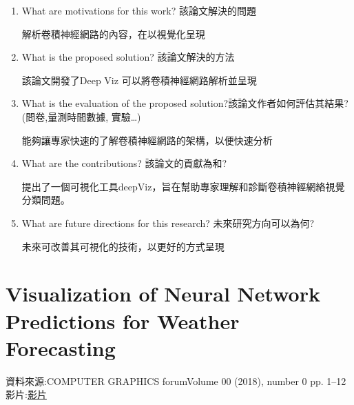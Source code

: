 \begin{enumerate}
\item  What are motivations for this work? 該論文解決的問題  

解析卷積神經網路的內容，在以視覺化呈現

\item  What is the proposed solution? 該論文解決的方法

該論文開發了Deep Viz 可以將卷積神經網路解析並呈現

\item  What is the evaluation of the proposed solution?該論文作者如何評估其結果? (問卷,量測時間數據, 實驗…)

能夠讓專家快速的了解卷積神經網路的架構，以便快速分析

\item  What are the contributions? 該論文的貢獻為和?

提出了一個可視化工具deepViz，旨在幫助專家理解和診斷卷積神經網絡視覺分類問題。

\item  What are future directions for this research? 未來研究方向可以為何?

未來可改善其可視化的技術，以更好的方式呈現

\end{enumerate}


\section{Visualization of Neural Network Predictions for Weather Forecasting}
資料來源:{COMPUTER GRAPHICS forumVolume 00 (2018), number 0 pp. 1–12 \cite{Roesch2017VisualizationON}}
\\
影片:\href{Visualization of Neural Network Predictions for Weather Forecasting (VMV 2017).mp4}{影片}
      
